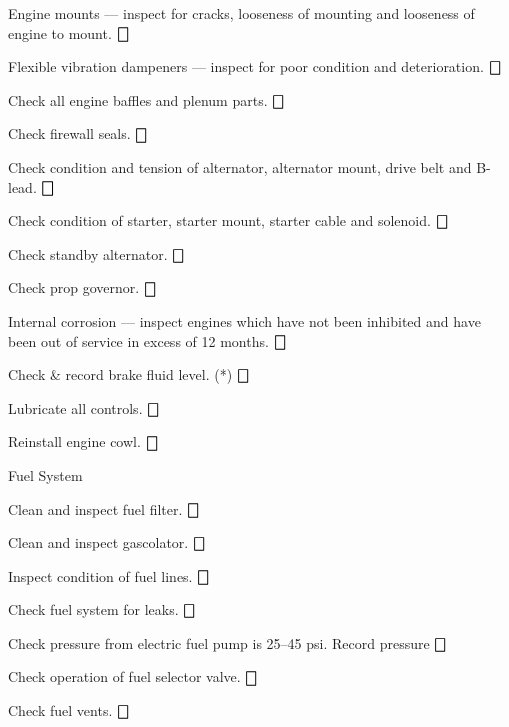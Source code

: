 \begin{enumerate*}
\begin{enumerate*}
\begin{enumerate*}
		\item Engine mounts --- inspect for cracks, looseness of mounting and looseness of engine to mount. \dotfill $\bigbox$
		\item Flexible vibration dampeners --- inspect for poor condition and deterioration. \dotfill $\bigbox$
		\item Check all engine baffles and plenum parts. \dotfill $\bigbox$
		\item Check firewall seals. \dotfill $\bigbox$
		\item Check condition and tension of alternator, alternator mount, drive belt and B-lead. \dotfill $\bigbox$
		\item Check condition of starter, starter mount, starter cable and solenoid. \dotfill $\bigbox$
		\item Check standby alternator. \dotfill $\bigbox$
		\item Check prop governor. \dotfill $\bigbox$
		\item Internal corrosion --- inspect engines which have not been inhibited and have been out of service in excess of 12 months. \dotfill $\bigbox$
	  \end{enumerate*}
		\item Check \& record brake fluid level.  (*) \dotfill $\bigbox$
		\item Lubricate all controls. \dotfill $\bigbox$
		\item Reinstall engine cowl.  \dotfill $\bigbox$
	\end{enumerate*}
	\item{Fuel System} 
	\begin{enumerate*}
		\item Clean and inspect fuel filter.  \dotfill $\bigbox$
		\item Clean and inspect gascolator.  \dotfill $\bigbox$
		\item Inspect condition of fuel lines. \dotfill $\bigbox$
		\item Check fuel system for leaks. \dotfill $\bigbox$
		\item Check pressure from electric fuel pump is 25--45 psi.  Record pressure   \dotfill $\bigbox$
		\item Check operation of fuel selector valve. \dotfill $\bigbox$
		\item Check fuel vents. \dotfill $\bigbox$
	\end{enumerate*}


\end{enumerate*}
